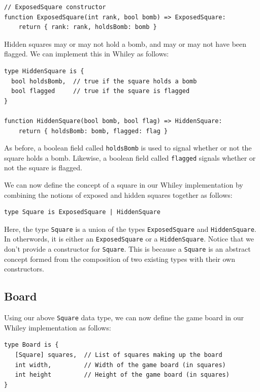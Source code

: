 \begin{lstlisting}
// ExposedSquare constructor
function ExposedSquare(int rank, bool bomb) => ExposedSquare:
    return { rank: rank, holdsBomb: bomb }
\end{lstlisting}


Hidden squares may or may not hold a bomb, and may or may not have been flagged.  We can implement this in Whiley as follows:

\begin{lstlisting}
type HiddenSquare is { 
  bool holdsBomb,  // true if the square holds a bomb
  bool flagged     // true if the square is flagged
}

function HiddenSquare(bool bomb, bool flag) => HiddenSquare:
    return { holdsBomb: bomb, flagged: flag }
\end{lstlisting}

As before, a boolean field called \lstinline{holdsBomb} is used to signal whether or not the square holds a bomb.  Likewise, a boolean field called \lstinline{flagged} signals whether or not the square is flagged.  

We can now define the concept of a square in our Whiley implementation by combining the notions of exposed and hidden squares together as follows:

\begin{lstlisting}
type Square is ExposedSquare | HiddenSquare
\end{lstlisting}

Here, the type \lstinline{Square} is a union of the types \lstinline{ExposedSquare} and \lstinline{HiddenSquare}.  In otherwords, it is either an \lstinline{ExposedSquare} or a \lstinline{HiddenSquare}.  Notice that we don't provide a constructor for \lstinline{Square}.  This is because a \lstinline{Square} is an abstract concept formed from the composition of two existing types with their own constructors.

\subsection{Board}

Using our above \lstinline{Square} data type, we can now define the game board in our Whiley implementation as follows:

\begin{lstlisting}
type Board is {
   [Square] squares,  // List of squares making up the board
   int width,         // Width of the game board (in squares)
   int height         // Height of the game board (in squares)
}
\end{lstlisting}

